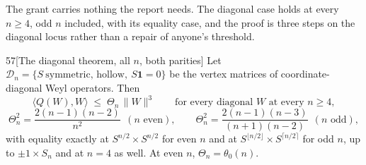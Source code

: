 The grant carries nothing the report needs. The diagonal case holds at every $n\ge4$, odd $n$ included, with its equality case, and the proof is three steps on the diagonal locus rather than a repair of anyone's threshold.

\begin{Lem}{57}[The diagonal theorem, all $n$, both parities]
Let $\mathcal D_n=\{S\ \text{symmetric, hollow},\ S\mathbf1=0\}$ be the vertex matrices of coordinate-diagonal Weyl operators. Then
\[
\langle Q(W),W\rangle\;\le\;\Theta_n\,\|W\|^3\qquad\text{for every diagonal }W\text{ at every }n\ge4,
\]
\[
\Theta_n^2=\frac{2(n-1)(n-2)}{n^2}\ \ (n\text{ even}),\qquad
\Theta_n^2=\frac{2(n-1)(n-3)}{(n+1)(n-2)}\ \ (n\text{ odd}),
\]
with equality exactly at $S^{n/2}\times S^{n/2}$ for even $n$ and at $S^{\lfloor n/2\rfloor}\times S^{\lceil n/2\rceil}$ for odd $n$, up to $\pm1\times S_n$ and at $n=4$ as well. At even $n$, $\Theta_n=\theta_0(n)$.
\end{Lem}

